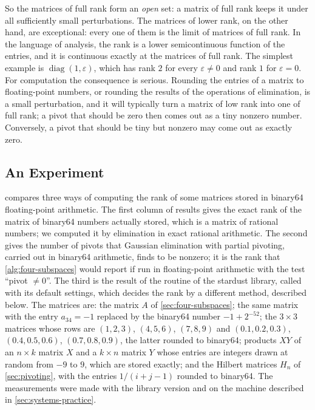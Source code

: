 So the matrices of full rank form an \emph{open} set: a matrix of full rank keeps it under all sufficiently small perturbations. The matrices of lower rank, on the other hand, are exceptional: every one of them is the limit of matrices of full rank. In the language of analysis, the rank is a lower semicontinuous function of the entries, and it is continuous exactly at the matrices of full rank. The simplest example is $\operatorname{diag}(1,\varepsilon)$, which has rank $2$ for every $\varepsilon\ne0$ and rank $1$ for $\varepsilon=0$. For computation the consequence is serious. Rounding the entries of a matrix to floating-point numbers, or rounding the results of the operations of elimination, is a small perturbation, and it will typically turn a matrix of low rank into one of full rank; a pivot that should be zero then comes out as a tiny nonzero number. Conversely, a pivot that should be tiny but nonzero may come out as exactly zero.

\subsection{An Experiment}

 compares three ways of computing the rank of some matrices stored in binary64 floating-point arithmetic. The first column of results gives the exact rank of the matrix of binary64 numbers actually stored, which is a matrix of rational numbers; we computed it by elimination in exact rational arithmetic. The second gives the number of pivots that Gaussian elimination with partial pivoting, carried out in binary64 arithmetic, finds to be nonzero; it is the rank that \cref{alg:four-subspaces} would report if run in floating-point arithmetic with the test ``pivot $\ne0$''. The third is the result of the routine  of the stardust library, called with its default settings, which decides the rank by a different method, described below. The matrices are: the matrix $A$ of \cref{sec:four-subspaces}; the same matrix with the entry $a_{34}=-1$ replaced by the binary64 number $-1+2^{-52}$; the $3\times3$ matrices whose rows are $(1,2,3)$, $(4,5,6)$, $(7,8,9)$ and $(0.1,0.2,0.3)$, $(0.4,0.5,0.6)$, $(0.7,0.8,0.9)$, the latter rounded to binary64; products $XY$ of an $n\times k$ matrix $X$ and a $k\times n$ matrix $Y$ whose entries are integers drawn at random from $-9$ to $9$, which are stored exactly; and the Hilbert matrices $H_n$ of \cref{sec:pivoting}, with the entries $1/(i+j-1)$ rounded to binary64. The measurements were made with the library version and on the machine described in \cref{sec:systems-practice}.

